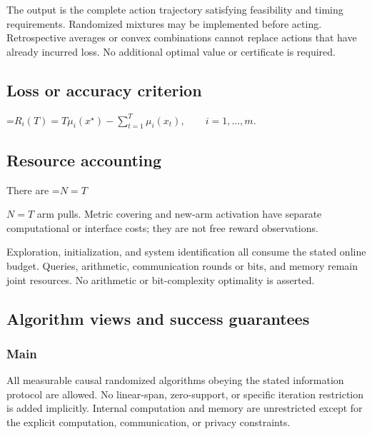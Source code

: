 \documentclass[10pt,a4paper]{article}
\newcommand{\AtlasMath}[1]{\par\begingroup\centering\setbox0=\hbox{$\displaystyle #1$}\ifdim\wd0>1.4\linewidth\typeout{ATLAS WIDE FORMULA: \the\wd0}\fi\ifdim\wd0>\linewidth\resizebox{\linewidth}{!}{\box0}\else\box0\fi\par\endgroup}
\newcommand{\AtlasInlineMath}[1]{\begingroup\setbox0=\hbox{$#1$}\ifdim\wd0>.4\linewidth\endgroup\AtlasMath{#1}\else\endgroup$#1$\fi}
\begin{document}
The output is the complete action trajectory satisfying feasibility and timing requirements. Randomized mixtures may be implemented before acting. Retrospective averages or convex combinations cannot replace actions that have already incurred loss. No additional optimal value or certificate is required.



\subsection{Loss or accuracy criterion}



\AtlasMath{R_i(T)=T\mu_i(x^\star)-\sum_{t=1}^{T}\mu_i(x_t),\qquad i=1,\ldots,m.}




\subsection{Resource accounting}


There are \AtlasInlineMath{N=T} arm pulls. Metric covering and new-arm activation have separate computational or interface costs; they are not free reward observations.



Exploration, initialization, and system identification all consume the stated online budget. Queries, arithmetic, communication rounds or bits, and memory remain joint resources. No arithmetic or bit-complexity optimality is asserted.



\subsection{Algorithm views and success guarantees}


\subsubsection{Main}


All measurable causal randomized algorithms obeying the stated information protocol are allowed. No linear-span, zero-support, or specific iteration restriction is added implicitly. Internal computation and memory are unrestricted except for the explicit computation, communication, or privacy constraints.
\end{document}
